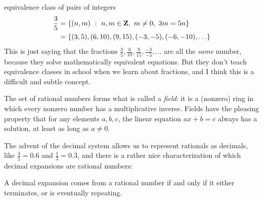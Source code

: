 \documentclass[11pt,oneside]{amsart}
\begin{document}
equivalence class of pairs of integers
\[\begin{aligned}
	\frac{3}{5} 
    & = \{ (n,m)\ :\ n,m\in \mathbf{Z},\ m\neq 0,\ 3m=5n \} \\
    & = \{ (3,5), (6,10), (9,15), (-3,-5), (-6,-10),\ldots\}
\end{aligned}
\]
This is just saying that the fractions $\frac{3}{5}, \frac{6}{10}, \frac{9}{15}, \frac{-3}{-5},\ldots$ are all the {\em same} number, because they solve mathematically equivalent
equations.  But they don't teach equivalence classes in school when we learn about fractions, and I think this is a difficult and subtle concept.

The set of rational numbers forms what is called a {\em field}: it is a (nonzero) ring in which every nonzero number has a multiplicative inverse.
Fields have the pleasing property that for any elements $a,b,c$, the linear equation $ax+b=c$ always has a solution, at least as long
as $a\neq 0$.

The advent of the decimal system allows us to represent rationals as decimals, like $\frac{3}{5} = 0.6$ and $\frac{1}{3} = 0.\overline{3}$,
and there is a rather nice characterization of which decimal expansions are rational numbers: 

\begin{proposition}\label{rat}
	A decimal expansion comes from a rational number if and only if it either terminates, or is eventually repeating.
\end{proposition}
\end{document}
